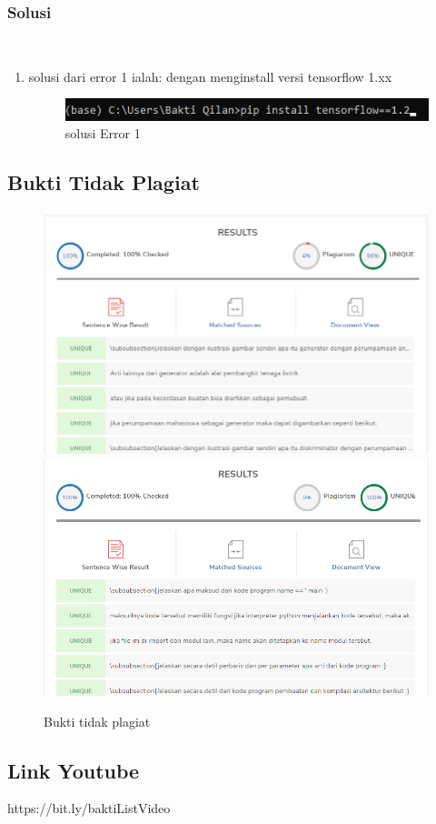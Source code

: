\subsubsection{Solusi}
\hfill\\
\begin{enumerate}
\item solusi dari error 1 ialah:
dengan menginstall versi tensorflow 1.xx
\begin{figure}[H]
	\centering
	\includegraphics[scale=0.5]{figures/1174083/figures8/s1.png}
	\caption{solusi Error 1}
\end{figure}
\end{enumerate}

\subsection{Bukti Tidak Plagiat}
\begin{figure}[H]
	\centering
	\includegraphics[width=12cm]{figures/1174083/figures8/plagiarisme1.png}
	\includegraphics[width=12cm]{figures/1174083/figures8/plagiarisme2.png}
	\caption{Bukti tidak plagiat}
\end{figure}

\subsection{Link Youtube}
https://bit.ly/baktiListVideo